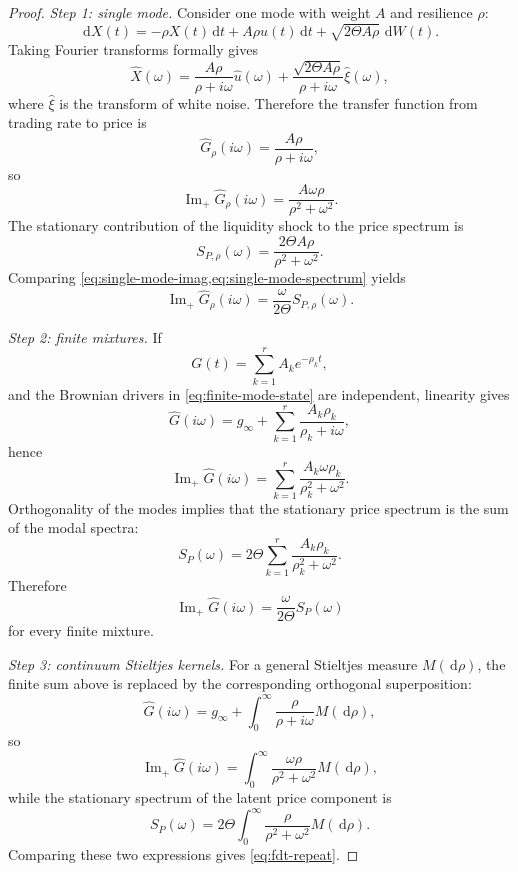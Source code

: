 \documentclass[11pt]{article}
\newcommand{\Ghat}{\widehat{G}}
\newcommand{\ImPart}{\operatorname{Im}_{\!+}}
\newcommand{\dd}{\,\mathrm{d}}
\begin{document}
\begin{proof}
\emph{Step 1: single mode.}
Consider one mode with weight $A$ and resilience $\rho$:
\begin{equation}\label{eq:single-mode-sde}
  \dd X(t)=-\rho X(t)\dd t + A\rho u(t)\dd t + \sqrt{2\Theta A\rho}\,\dd W(t).
\end{equation}
Taking Fourier transforms formally gives
\[
  \widehat{X}(\omega)
  =
  \frac{A\rho}{\rho+i\omega}\widehat{u}(\omega)
  +
  \frac{\sqrt{2\Theta A\rho}}{\rho+i\omega}\widehat{\xi}(\omega),
\]
where $\widehat{\xi}$ is the transform of white noise. Therefore the transfer function from trading rate to price is
\[
  \Ghat_{\rho}(i\omega)=\frac{A\rho}{\rho+i\omega},
\]
so
\begin{equation}\label{eq:single-mode-imag}
  \ImPart \Ghat_{\rho}(i\omega)=\frac{A\omega\rho}{\rho^2+\omega^2}.
\end{equation}
The stationary contribution of the liquidity shock to the price spectrum is
\begin{equation}\label{eq:single-mode-spectrum}
  S_{P,\rho}(\omega)
  =
  \frac{2\Theta A\rho}{\rho^2+\omega^2}.
\end{equation}
Comparing \cref{eq:single-mode-imag,eq:single-mode-spectrum} yields
\[
  \ImPart \Ghat_{\rho}(i\omega)=\frac{\omega}{2\Theta}S_{P,\rho}(\omega).
\]

\emph{Step 2: finite mixtures.}
If
\[
  G(t)=\sum_{k=1}^r A_k e^{-\rho_k t},
\]
and the Brownian drivers in \cref{eq:finite-mode-state} are independent, linearity gives
\[
  \Ghat(i\omega)=g_\infty+\sum_{k=1}^r \frac{A_k\rho_k}{\rho_k+i\omega},
\]
hence
\[
  \ImPart \Ghat(i\omega)=\sum_{k=1}^r \frac{A_k\omega\rho_k}{\rho_k^2+\omega^2}.
\]
Orthogonality of the modes implies that the stationary price spectrum is the sum of the modal spectra:
\[
  S_P(\omega)=2\Theta\sum_{k=1}^r \frac{A_k\rho_k}{\rho_k^2+\omega^2}.
\]
Therefore
\[
  \ImPart \Ghat(i\omega)=\frac{\omega}{2\Theta}S_P(\omega)
\]
for every finite mixture.

\emph{Step 3: continuum Stieltjes kernels.}
For a general Stieltjes measure $M(\dd\rho)$, the finite sum above is replaced by the corresponding orthogonal superposition:
\[
  \Ghat(i\omega)=g_\infty+\int_0^\infty \frac{\rho}{\rho+i\omega}M(\dd\rho),
\]
so
\begin{equation}\label{eq:imaginary-part}
  \ImPart \Ghat(i\omega)=\int_0^\infty \frac{\omega\rho}{\rho^2+\omega^2}M(\dd\rho),
\end{equation}
while the stationary spectrum of the latent price component is
\[
  S_P(\omega)=2\Theta\int_0^\infty \frac{\rho}{\rho^2+\omega^2}M(\dd\rho).
\]
Comparing these two expressions gives \cref{eq:fdt-repeat}.
\end{proof}
\end{document}
